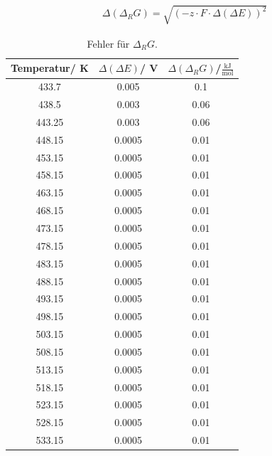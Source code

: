 \documentclass[12pt,a4paper,titlepage,headinclude,bibtotoc]{scrartcl}
\begin{document}
\begin{align}
\Delta(\Delta_R G)= \sqrt{(-z\cdot F \cdot \Delta(\Delta E))^2}
\end{align}
\begin{table}[h]
\centering
\caption{Fehler für $\Delta_R G$.}
\begin{tabular}{c|c|c}
Temperatur/ K & $\Delta(\Delta E)$/ V & $\Delta(\Delta_R G)$/\;$\frac{\text{kJ}}{\text{mol}}$ \\
\hline
433.7 &  0.005 &  0.1  \\
438.5 & 0.003   & 0.06 \\
443.25 & 0.003  & 0.06 \\
448.15 &  0.0005& 0.01 \\
453.15 & 0.0005& 0.01 \\
458.15 &  0.0005& 0.01 \\
463.15 & 0.0005& 0.01 \\
468.15 & 0.0005& 0.01 \\
473.15 & 0.0005& 0.01 \\
478.15 & 0.0005& 0.01 \\
483.15 & 0.0005& 0.01 \\
488.15 & 0.0005& 0.01 \\
493.15 & 0.0005& 0.01 \\
498.15 & 0.0005& 0.01 \\
503.15 & 0.0005& 0.01 \\
508.15 & 0.0005& 0.01 \\
513.15 & 0.0005& 0.01 \\
518.15 & 0.0005& 0.01 \\
523.15 & 0.0005& 0.01 \\
528.15 & 0.0005& 0.01 \\
533.15 & 0.0005& 0.01 \\
\end{tabular}
\end{table}
\FloatBarrier
\end{document}
